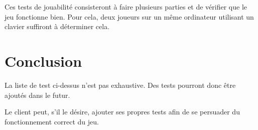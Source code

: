 Ces tests de jouabilité consisteront à faire plusieurs parties et de vérifier que le jeu fonctionne bien. Pour cela, deux joueurs sur un même ordinateur utilisant un clavier suffiront à déterminer cela.

\newpage

\section*{Conclusion}

La liste de test ci-dessus n'est pas exhaustive. Des tests pourront donc être ajoutés dans le futur.

Le client peut, s'il le désire, ajouter ses propres tests afin de se persuader du fonctionnement correct du jeu.